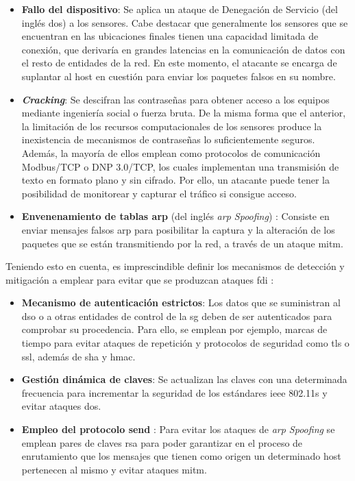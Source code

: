 \begin{itemize}
  \item \textbf{Fallo del dispositivo}: Se aplica un ataque de Denegación de Servicio (del inglés \gls{dos}) a los sensores. Cabe destacar que generalmente los sensores que se encuentran en las ubicaciones finales tienen una capacidad limitada de conexión, que derivaría en grandes latencias en la comunicación de datos con el resto de entidades de la red. En este momento, el atacante se encarga de suplantar al host en cuestión para enviar los paquetes falsos en su nombre.
  \item \textbf{\textit{Cracking}}: Se descifran las contraseñas para obtener acceso a los equipos mediante ingeniería social o fuerza bruta. De la misma forma que el anterior, la limitación de los recursos computacionales de los sensores produce la inexistencia de mecanismos de contraseñas lo suficientemente seguros. Además, la mayoría de ellos emplean como protocolos de comunicación Modbus/TCP o DNP 3.0/TCP, los cuales implementan una transmisión de texto en formato plano y sin cifrado. Por ello, un atacante puede tener la posibilidad de monitorear y capturar el tráfico si consigue acceso.
  \item \textbf{Envenenamiento de tablas \gls{arp}} (del inglés \textit{\gls{arp} Spoofing}) \cite{arp}: Consiste en enviar mensajes falsos \gls{arp} para posibilitar la captura y la alteración de los paquetes que se están transmitiendo por la red, a través de un ataque \gls{mitm}. 
\end{itemize}

Teniendo esto en cuenta, es imprescindible definir los mecanismos de detección y mitigación a emplear para evitar que se produzcan ataques \gls{fdi} \cite{baddata}:

\begin{itemize}
  \item \textbf{Mecanismo de autenticación estrictos}: Los datos que se suministran al \gls{dso} o a otras entidades de control de la \gls{sg} deben de ser autenticados para comprobar su procedencia. Para ello, se emplean por ejemplo, marcas de tiempo para evitar ataques de repetición y protocolos de seguridad como \gls{tls} o \gls{ssl}, además de \gls{sha} y \gls{hmac}.
  \item \textbf{Gestión dinámica de claves}: Se actualizan las claves con una determinada frecuencia para incrementar la seguridad de los estándares \gls{ieee} 802.11s y evitar ataques \gls{dos}.
  \item \textbf{Empleo del protocolo \gls{send}} \cite{send}: Para evitar los ataques de \textit{\gls{arp} Spoofing} se emplean pares de claves \gls{rsa} para poder garantizar en el proceso de enrutamiento que los mensajes que tienen como origen un determinado host pertenecen al mismo y evitar ataques \gls{mitm}.
\end{itemize}

